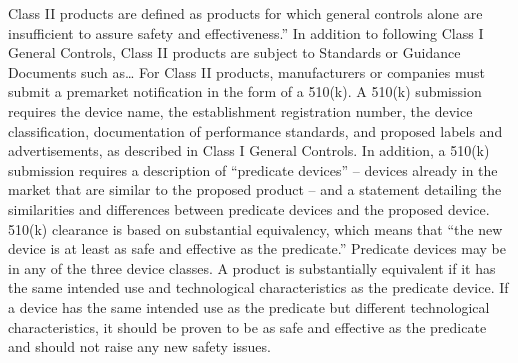 \documentclass{article}
\begin{document}
Class II products are defined as products for which general controls alone are
insufficient to assure safety and effectiveness.” In addition to following Class I General Controls, Class II products are subject to Standards or Guidance Documents such as… For Class II products, manufacturers or companies must submit a premarket notification in the form of a 510(k). A 510(k) submission requires the device name, the establishment registration number, the device classification, documentation of performance standards, and proposed labels and advertisements, as described in Class I General Controls. In addition, a 510(k) submission requires a description of “predicate devices” – devices already in the market that are similar to the proposed product – and a statement detailing the similarities and differences between predicate devices and the proposed device. 510(k) clearance is based on substantial equivalency, which means that “the new device is at least as safe and effective as the predicate.” Predicate devices may be in any of the three device classes. A product is substantially equivalent if it has the same intended use  and technological characteristics as the predicate device. If a device has the same intended use as the predicate but different technological characteristics, it should be proven to be as safe and effective as the predicate and should not raise any new safety issues. 
	 
\end{document}
